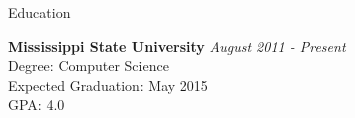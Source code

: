 \documentclass{resume} %
\begin{document}






\begin{rSection}{Education}

	{\bf Mississippi State University} \hfill {\em August 2011 - Present} \\ 
	Degree: Computer Science \\
	Expected Graduation: May 2015 \\
	GPA: 4.0

\end{rSection}


\end{document}
